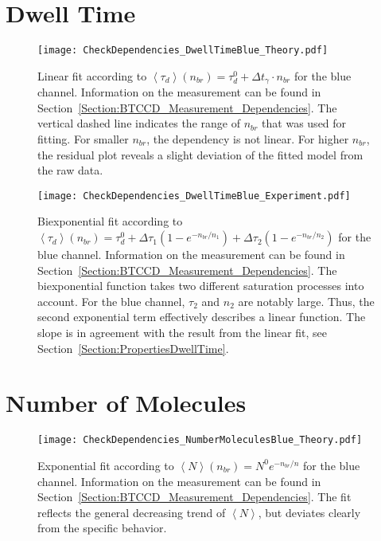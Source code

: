 \section{Dwell Time} 

\vfill
\begin{figure}[h]
	\centering
	\texttt{[image: CheckDependencies\_DwellTimeBlue\_Theory.pdf]}
	\caption[Linear fit of dwell time for blue channel]{Linear fit according to $\left\langle \tau_d \right\rangle (n_{br}) =  \tau_d^0 + \Delta t_{\gamma} \cdot n_{br}$ for the blue channel. Information on the measurement can be found in Section~\ref{Section:BTCCD_Measurement_Dependencies}. The vertical dashed line indicates the range of $n_{br}$ that was used for fitting. For smaller $n_{br}$, the dependency is not linear. For higher $n_{br}$, the residual plot reveals a slight deviation of the fitted model from the raw data.}
	\label{fig:CheckDependencies_DwellTimeBlue_Theory}
\end{figure}
\vfill

\vfill
\begin{figure}[h]
	\centering
	\texttt{[image: CheckDependencies\_DwellTimeBlue\_Experiment.pdf]}
	\caption[Biexponential fit of dwell time for blue channel]{Biexponential fit according to $\left\langle \tau_d \right\rangle (n_{br}) = \tau_d^0 + \Delta \tau_1 (1 - e^{-n_{br}/ n_1}) + \Delta \tau_2 (1 - e^{-n_{br}/ n_2})$ for the blue channel. Information on the measurement can be found in Section~\ref{Section:BTCCD_Measurement_Dependencies}. The biexponential function takes two different saturation processes into account. For the blue channel, $\tau_2$ and $n_2$ are notably large. Thus, the second exponential term effectively describes a linear function. The slope is in agreement with the result from the linear fit, see Section~\ref{Section:PropertiesDwellTime}.}
	\label{fig:CheckDependencies_DwellTimeBlue_Experiment}
\end{figure}
\vfill

\clearpage

\section{Number of Molecules} 

\vfill
\begin{figure}[h]
	\centering
	\texttt{[image: CheckDependencies\_NumberMoleculesBlue\_Theory.pdf]}
	\caption[Exponential fit of molecule number for blue channel]{Exponential fit according to $\left\langle N \right\rangle (n_{br}) = N^0e^{-n_{br}/ n}$ for the blue channel. Information on the measurement can be found in Section~\ref{Section:BTCCD_Measurement_Dependencies}. The fit reflects the general decreasing trend of $\left\langle N \right\rangle$, but deviates clearly from the specific behavior.}
	\label{fig:CheckDependencies_NumberMoleculesBlue_Theory}
\end{figure}
\vfill

